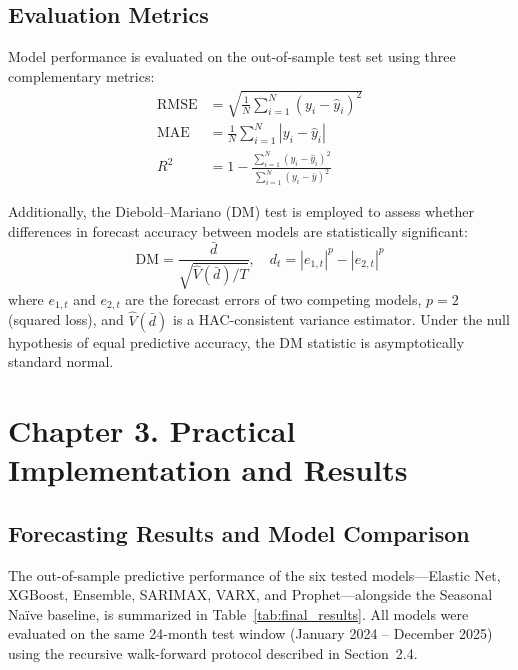 \documentclass[14pt, a4paper]{extarticle}
\begin{document}
\subsection{Evaluation Metrics}
Model performance is evaluated on the out-of-sample test set using three complementary metrics:
\begin{align}
    \text{RMSE}  &= \sqrt{\frac{1}{N} \sum_{i=1}^N (y_i - \widehat{y}_i)^2} \label{eq:rmse} \\
    \text{MAE}   &= \frac{1}{N} \sum_{i=1}^N |y_i - \widehat{y}_i| \label{eq:mae} \\
    R^2 &= 1 - \frac{\sum_{i=1}^N (y_i - \widehat{y}_i)^2}{\sum_{i=1}^N (y_i - \bar{y})^2} \label{eq:r2}
\end{align}

Additionally, the Diebold--Mariano (DM) test \cite{hyndman2021} is employed to assess whether differences in forecast accuracy between models are statistically significant:
\begin{equation}
    \text{DM} = \frac{\bar{d}}{\sqrt{\hat{V}(\bar{d})/T}}, \quad d_t = |e_{1,t}|^p - |e_{2,t}|^p
    \label{eq:dm}
\end{equation}
where $e_{1,t}$ and $e_{2,t}$ are the forecast errors of two competing models, $p=2$ (squared loss), and $\hat{V}(\bar{d})$ is a HAC-consistent variance estimator. Under the null hypothesis of equal predictive accuracy, the DM statistic is asymptotically standard normal.

\newpage
\section{Chapter 3. Practical Implementation and Results}

\subsection{Forecasting Results and Model Comparison}
The out-of-sample predictive performance of the six tested models---Elastic Net, XGBoost, Ensemble, SARIMAX, VARX, and Prophet---alongside the Seasonal Na\"ive baseline, is summarized in Table~\ref{tab:final_results}. All models were evaluated on the same 24-month test window (January 2024 -- December 2025) using the recursive walk-forward protocol described in Section~2.4.
\end{document}

